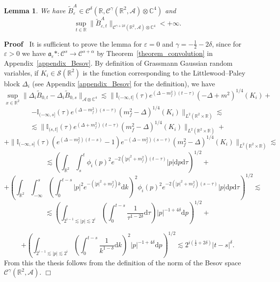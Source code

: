 \documentclass{article}
\newcommand{\asterisk}{\mathord{*}}
\newcommand{\mathd}{\mathrm{d}}
\newcommand{\nobracket}{}
\newenvironment{proof}{\noindent\textbf{Proof\ }}{\hspace*{\fill}$\Box$\medskip}
\newtheorem{lemma}[theorem]{Lemma}
\begin{document}
\begin{lemma}
  \label{lemma_noise}We have $\tilde{B}^A_{\varepsilon} \in
  \mathcal{C}^{\delta} (\mathbb{R}, \mathcal{C}^{\gamma} (\mathbb{R}^2,
  \mathcal{A}) \otimes \mathbb{C}^4)$ and
  \[ \sup_{t \in \mathbb{R}} \| \tilde{B}^A_{\varepsilon, t}
     \|_{\mathcal{C}^{\gamma + 2 \delta} (\mathbb{R}^2, \mathcal{A}) \otimes
     \mathbb{C}^4} < + \infty ._{} \]
\end{lemma}

\begin{proof}
  It is sufficient to prove the lemma for $\varepsilon = 0$ and $\gamma = -
  \frac{1}{2} - 2 \delta$, since for $\varepsilon > 0$ we have
  $\mathfrak{a}_{\varepsilon} \asterisk : \mathcal{C}^s \rightarrow
  \mathcal{C}^{s + \alpha}$ by Theorem~\ref{theorem_convolution} in
  Appendix~\ref{appendix_Besov}. By definition of Grassmann Gaussian random
  variables, if $K_i \in \mathcal{S} (\mathbb{R}^2)$ is the function
  corresponding to the Littlewood--Paley block $\Delta_i$ (see Appendix
  \ref{appendix_Besov} for the definition), we have
  \[ \sup_{x \in \mathbb{R}^2} \| \Delta_i \tilde{B}_{0, t} - \Delta_i
     \tilde{B}_{0, s} \|_{\mathcal{A} \otimes \mathbb{C}^4} \lesssim \|
     \mathbb{I}_{(- \infty, t]} (\tau) e^{(\Delta - m_f^2) (t - \tau)} (-
     \Delta + m^2)^{1 / 4} (K_i) + \nobracket \]
  \[ \nobracket \nobracket -\mathbb{I}_{(- \infty, s]} (\tau) e^{(\Delta -
     m_f^2) (s - \tau)} (m^2_f - \Delta)^{1 / 4} (K_i) \| \nobracket_{L^2
     (\mathbb{R}^2 \times \mathbb{R})} \lesssim \]
  \[ \lesssim \| \mathbb{I}_{(s, t]} (\tau) e^{(\Delta + m_f^2) (t - \tau)}
     (m^2_f - \Delta)^{1 / 4} (K_i) \|_{L^2 (\mathbb{R}^2 \times \mathbb{R})}
     + \]
  \[ + \| \mathbb{I}_{(- \infty, s]} (\tau) (e^{(\Delta - m_f^2) (t - s)} - 1)
     e^{- (\Delta - m_f^2) (s - \tau)} (m^2_f - \Delta)^{1 / 4} (K_i) \|_{L^2
     (\mathbb{R}^2 \times \mathbb{R})} \lesssim \]
  \[ \lesssim \left( \int_{\mathbb{R}^2} \int_s^t \phi_i (p)^2 e^{- 2 (| p |^2
     + m_f^2) (t - \tau)} | p | \mathd p \mathd \tau \right)^{1 / 2} + \]
  \[ + \left( \int_{\mathbb{R}^2} \int_{- \infty}^s \left( \int_0^{t - s} | p
     |^2 e^{- (| p |^2 + m_f^2) k} \mathd k^{} \right)^2 \phi_i (p)^2 e^{- 2
     (| p |^2 + m_f^2) (s - \tau)} | p | \mathd p \mathd \tau \right)^{1 / 2}
     \lesssim \]
  \[ \lesssim \left( \int_{2^{i - 1} \lesssim | p | \lesssim 2^i} \left(
     \int_0^{t - s} \frac{1}{\tau^{1 - 2 \delta}} \mathd \tau \right) | p |^{-
     1 + 4 \delta} \mathd p \right)^{1 / 2} + \]
  
  \[ + \left( \int_{2^{i - 1} \lesssim | p | \lesssim 2^i} \left( \int_0^{t -
     s} \frac{1}{k^{1 - \delta}} \mathd k \right)^2 | p |^{- 1 + 4 \delta}
     \mathd p \right)^{1 / 2} \lesssim 2^{i \left( \frac{1}{2} + 2 \delta
     \right)} | t - s |^{\delta} . \]
  From this the thesis follows from the definition of the norm of the Besov
  space $\mathcal{C}^{\gamma} (\mathbb{R}^2, \mathcal{A})$.
\end{proof}
\end{document}
